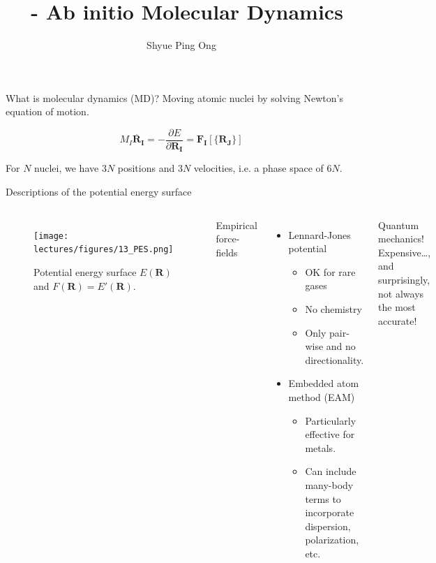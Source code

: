 \documentclass[aspectratio=169]{beamer}
\title[\classname AIMD]{\classname~- Ab initio Molecular Dynamics}
\author{Shyue Ping Ong}
\institute[UCSD]{University of California, San Diego\\
\medskip
}
\date{\classyear} %
\let \vec \mathbf
\begin{document}
    \begin{frame}
        \titlepage %
    \end{frame}


    \begin{frame}{What is molecular dynamics (MD)?}
        Moving atomic nuclei by solving Newton’s equation of motion.

        \begin{equation*}
            M_I \ddot{\vec{R_I}} = - \frac{\partial E}{\partial \vec{R_I}} = \vec{F_I}[\{\vec{R_J}\}]
        \end{equation*}

        For $N$ nuclei, we have $3N$ positions and $3N$ velocities, i.e. a phase space of $6N$.

    \end{frame}


    \begin{frame}{Descriptions of the potential energy surface}

        \begin{columns}
            \begin{figure}
                \centering
                \texttt{[image: lectures/figures/13\_PES.png]}
                \caption{Potential energy surface $E(\vec{R})$ and $F(\vec{R}) = E'(\vec{R})$.}
            \end{figure}
            Empirical force-fields
            \begin{itemize}
                \item Lennard-Jones potential
                \begin{itemize}

                    \item OK for rare gases
                    \item No chemistry
                    \item Only pair-wise and no directionality.
                \end{itemize}
                \item Embedded atom method (EAM)
                \begin{itemize}
                    \item Particularly effective for metals.
                    \item Can include many-body terms to incorporate dispersion, polarization, etc.
                \end{itemize}
            \end{itemize}

            Quantum mechanics!
            Expensive…, and surprisingly, not always the most accurate!

        \end{columns}

    \end{frame}
\end{document}
